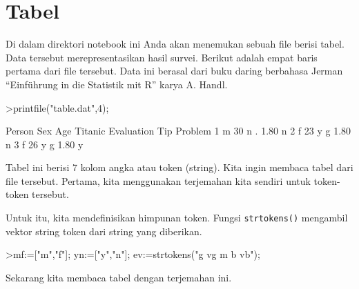 \documentclass[a4paper,11pt,oneside,enabledeprecatedfontcommands]{scrbook}
\newenvironment{eulernotebook}{}{}
\newcommand{\eulerheading}[1]{\chapter{#1}}
\newenvironment{eulercomment}{\par\medskip\noindent}{\par\medskip}
\begin{document}
\begin{eulernotebook}
		\eulerheading{Tabel}
		\begin{eulercomment}
			Di dalam direktori notebook ini Anda akan menemukan sebuah file berisi tabel. Data tersebut
			merepresentasikan hasil survei. Berikut adalah empat baris pertama dari file tersebut. Data ini
			berasal dari buku daring berbahasa Jerman ``Einführung in die Statistik mit R'' karya A. Handl.
		\end{eulercomment}
		\begin{eulerprompt}
			>printfile("table.dat",4);
		\end{eulerprompt}
		\begin{euleroutput}
			Person Sex Age Titanic Evaluation Tip Problem
			1 m 30 n . 1.80 n
			2 f 23 y g 1.80 n
			3 f 26 y g 1.80 y
		\end{euleroutput}
		\begin{eulercomment}
			Tabel ini berisi 7 kolom angka atau token (string). Kita ingin membaca tabel dari file tersebut.
			Pertama, kita menggunakan terjemahan kita sendiri untuk token-token tersebut.
			
			Untuk itu, kita mendefinisikan himpunan token. Fungsi \texttt{strtokens()} mengambil vektor string token dari
			string yang diberikan.
		\end{eulercomment}
		\begin{eulerprompt}
			>mf:=["m","f"]; yn:=["y","n"]; ev:=strtokens("g vg m b vb");
		\end{eulerprompt}
		\begin{eulercomment}
			Sekarang kita membaca tabel dengan terjemahan ini.
			

\end{eulercomment}
\end{eulernotebook}
\end{document}
